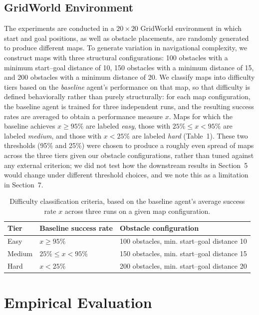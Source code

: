 \documentclass[11pt]{article}
\begin{document}
\subsection{GridWorld Environment}

The experiments are conducted in a $20\times20$ GridWorld environment in which start and goal positions, as well as obstacle placements, are randomly generated to produce different maps. To generate variation in navigational complexity, we construct maps with three structural configurations: 100 obstacles with a minimum start--goal distance of 10, 150 obstacles with a minimum distance of 15, and 200 obstacles with a minimum distance of 20. We classify maps into difficulty tiers based on the \emph{baseline} agent's performance on that map, so that difficulty is defined behaviorally rather than purely structurally: for each map configuration, the baseline agent is trained for three independent runs, and the resulting success rates are averaged to obtain a performance measure $x$. Maps for which the baseline achieves $x \geq 95\%$ are labeled \emph{easy}, those with $25\% \leq x < 95\%$ are labeled \emph{medium}, and those with $x < 25\%$ are labeled \emph{hard} (Table~1). These two thresholds (95\% and 25\%) were chosen to produce a roughly even spread of maps across the three tiers given our obstacle configurations, rather than tuned against any external criterion; we did not test how the downstream results in Section~5 would change under different threshold choices, and we note this as a limitation in Section~7.

\begin{table}[h]
\centering
\caption{Difficulty classification criteria, based on the baseline agent's average success rate $x$ across three runs on a given map configuration.}
\begin{tabular}{lll}
\toprule
Tier & Baseline success rate & Obstacle configuration \\
\midrule
Easy & $x \geq 95\%$ & 100 obstacles, min. start--goal distance 10 \\
Medium & $25\% \leq x < 95\%$ & 150 obstacles, min. start--goal distance 15 \\
Hard & $x < 25\%$ & 200 obstacles, min. start--goal distance 20 \\
\bottomrule
\end{tabular}
\end{table}


\section{Empirical Evaluation}
\end{document}
